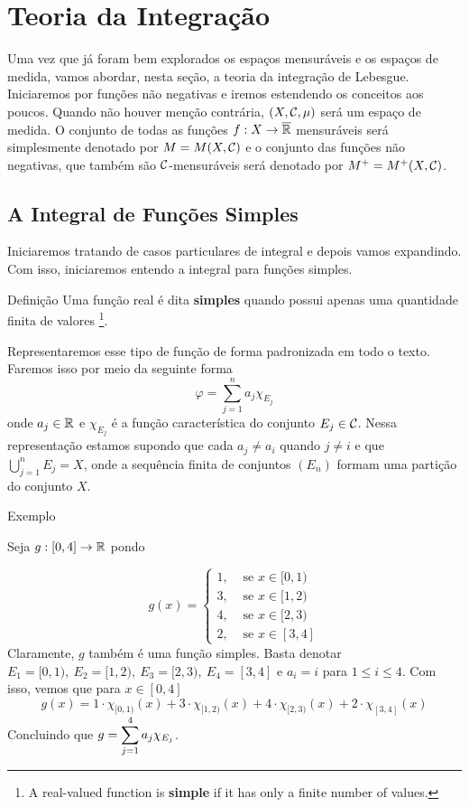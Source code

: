 \chapter{Teoria da Integração}
Uma vez que já foram bem explorados os espaços mensuráveis e os espaços de medida, vamos abordar, nesta seção, a teoria da integração de Lebesgue.
Iniciaremos por funções não negativas e iremos estendendo os conceitos aos poucos.
Quando não houver menção contrária, $(X, \operatorname{\mathcal{C}}, \mu)$ será um espaço de medida.
O conjunto de todas as funções $f:X \to \operatorname{\overline{\mathbb{R}}}$ mensuráveis será simplesmente denotado por $M = M(X, \operatorname{\mathcal{C}})$ e o conjunto das funções não negativas, que também são $\operatorname{\mathcal{C}}$-mensuráveis será denotado por $M^+ = M^+(X, \operatorname{\mathcal{C}})$. 

\section{A Integral de Funções Simples}
	Iniciaremos tratando de casos particulares de integral e depois vamos expandindo.
	Com isso, iniciaremos entendo a integral para funções simples.

\begin{env}{Definição}
    Uma função real é dita \textbf{simples} quando possui apenas uma quantidade finita de valores \cite[p.27, tradução nossa]{bartle}
    \footnote{A real-valued function is \textbf{simple} if it has only a finite number of values.}.
\end{env}

Representaremos esse tipo de função de forma padronizada em todo o texto.
Faremos isso por meio da seguinte forma
$$
\varphi =  \sum_{j = 1}^n a_j\chi_{E_j}
$$
onde $a_j \in \mathbb{R}$ e $\chi_{E_j}$ é a função característica do conjunto $E_j \in \operatorname{\mathcal{C}}$.
Nessa representação estamos supondo que cada $a_j \neq a_i$ quando $j \neq i$ e que
$\displaystyle \bigcup_{j = 1}^n E_j = X$, onde a sequência finita de conjuntos $(E_n)$ formam uma partição do conjunto $X$.

\begin{env}{Exemplo}
\label{ex:função-escada-part-2}

    Seja $g: [0,4] \to \mathbb{R}$ pondo 
    
    $$g(x) = \left\{
    \begin{array}{cc}
         1, & \textrm{\ se } x \in [0,1) \\
         3, & \textrm{\ se } x \in [1,2) \\
         4, & \textrm{\ se } x \in [2,3) \\
         2, & \textrm{\ se } x \in [3,4]
    \end{array}\right.
    $$
    Claramente, $g$ também é uma função simples.
    Basta denotar 
    $E_1 = [0,1),\ 
     E_2 = [1,2),\   
     E_3 = [2,3),\  
     E_4 = [3,4]$ e 
     $ a_i = i$ para $1 \leq i \leq 4$.
    Com isso, vemos que para $x \in [0,4]$
    $$
    g(x) = 1\cdot \chi_{[0,1)}(x) + 3\cdot \chi_{[1,2)}(x) + 4\cdot \chi_{[2,3)}(x) + 2\cdot \chi_{[3,4]}(x)
    $$
    Concluindo que $g = \displaystyle \sum_{j = 1}^4 a_j\chi_{E_j}$. 
\end{env}

